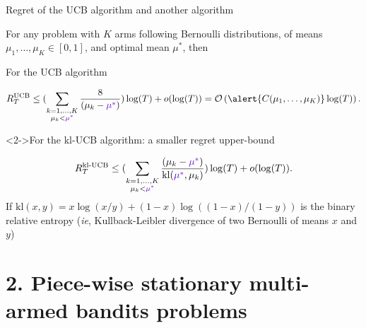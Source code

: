 \documentclass[11pt,english,ignorenonframetext,]{beamer}
\begin{document}
\begin{frame}{Regret of the UCB algorithm and another algorithm}

  For any problem with $K$ arms following Bernoulli distributions, of means $\mu_1,\dots,\mu_K \in[0,1]$, and \textcolor{deeppurple}{optimal mean $\mu^*$}, then

  \begin{exampleblock}{For the UCB algorithm}
    \begin{small}
      \[ R_T^{\mathrm{UCB}} \leq ( \sum_{\substack{k=1,\dots,K \\ \mu_k < \textcolor{deeppurple}{\mu^*}}} \frac{8}{(\mu_k - \textcolor{deeppurple}{\mu^*})} ) \log(T) + o(\log(T)) = \mathcal{O}\left( \alert{C(\mu_1,\dots,\mu_K)} \log(T) \right). \]
    \end{small}%
  \end{exampleblock}

  \begin{exampleblock}<2->{For the kl-UCB algorithm: a smaller regret upper-bound}
    \begin{small}
      \[ R_T^{\mathrm{kl}\text{-}\mathrm{UCB}} \leq ( \sum_{\substack{k=1,\dots,K \\ \mu_k < \textcolor{deeppurple}{\mu^*}}} \frac{(\mu_k - \textcolor{deeppurple}{\mu^*})}{\mathrm{kl}(\textcolor{deeppurple}{\mu^*}, \mu_k)} ) \log(T) + o(\log(T)). \]
      If $\mathrm{kl}(x, y) = x \log(x/y) + (1-x) \log((1-x)/(1-y))$ is the binary relative entropy (\emph{ie}, Kullback-Leibler divergence of two Bernoulli of means $x$ and $y$)
    \end{small}%
  \end{exampleblock}

\end{frame}


\section{\hfill{}2. Piece-wise stationary multi-armed bandits problems\hfill{}}
\end{document}
